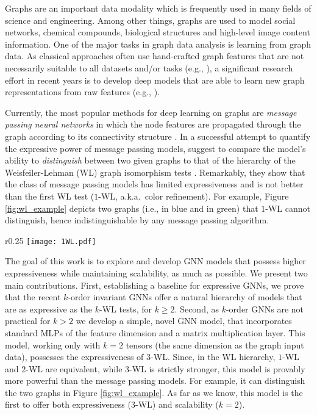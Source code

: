 \documentclass{article}
\newcommand{\eg}{{e.g.}}
\newcommand{\ie}{{i.e.}}
\begin{document}
Graphs are an important data modality which is frequently used in many fields of science and engineering. Among other things, graphs are used to model social networks, chemical compounds, biological structures and high-level image content information. One of the major tasks in graph data analysis is learning from graph data. As classical approaches often use hand-crafted graph features that are not necessarily suitable to all datasets and/or tasks (\eg, \cite{kriege2019survey}), a significant research effort in recent years is to develop deep models that are able to learn new graph representations from raw features (\eg, \citet{Gori2005,Duvenaud2015,Niepert2016,kipf,Velickovic2017,monti2017geometric,Hamilton2017,morris2018weisfeiler,xu2018how}).

Currently, the most popular methods for deep learning on graphs are \emph{message passing neural networks} in which the node features are propagated through the graph according to its connectivity structure \citep{Gilmer2017}.  In a successful attempt to quantify the expressive power of message passing models, \citet{morris2018weisfeiler,xu2018how} suggest to compare the model's ability to \emph{distinguish} between two given graphs to that of the hierarchy of the Weisfeiler-Lehman (WL) graph isomorphism tests \citep{grohe2017descriptive,babai2016graph}. Remarkably, they show that the class of message passing models has limited expressiveness and is not better than the first WL test ($1$-WL, a.k.a.~color refinement).  For example, Figure \ref{fig:wl_example} depicts two graphs (\ie, in blue and in green) that $1$-WL cannot distinguish, hence indistinguishable by any message passing algorithm.  

\begin{wrapfigure}[12]{r}{0.25\textwidth}
\vspace{-10pt}
\hspace{7pt}
\texttt{[image: 1WL.pdf]}
\vspace{0pt}
\caption{Two graphs not distinguished by $1$-WL.}\label{fig:wl_example}
\end{wrapfigure} 


The goal of this work is to explore and develop GNN models that possess higher expressiveness while maintaining scalability, as much as possible. We present two main contributions. First, establishing a baseline for expressive GNNs, we prove that the recent $k$-order invariant GNNs \citep{maron2018invariant,maron2019universality} offer a natural hierarchy of models that are as expressive as the $k$-WL tests, for $k\geq 2$. Second, as $k$-order GNNs are not practical for $k>2$ we develop a simple, novel GNN model, that incorporates standard MLPs of the feature dimension and a matrix multiplication layer. This model, working only with $k=2$ tensors (the same dimension as the graph input data), possesses the expressiveness of $3$-WL. Since, in the WL hierarchy, $1$-WL and $2$-WL are equivalent, while $3$-WL is strictly stronger, this model is provably more powerful than the message passing models. For example, it can distinguish the two graphs in Figure \ref{fig:wl_example}. As far as we know, this model is the first to offer both expressiveness ($3$-WL) and scalability ($k=2$). 
\end{document}
